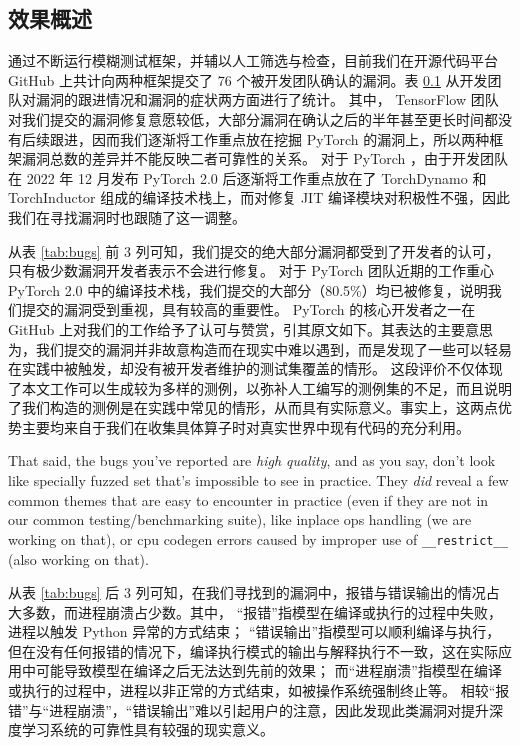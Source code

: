 \subsection{效果概述}

通过不断运行模糊测试框架，并辅以人工筛选与检查，目前我们在开源代码平台 GitHub 上共计向两种框架提交了 76 个被开发团队确认的漏洞。表 \ref{} 从开发团队对漏洞的跟进情况和漏洞的症状两方面进行了统计。
其中， TensorFlow 团队对我们提交的漏洞修复意愿较低，大部分漏洞在确认之后的半年甚至更长时间都没有后续跟进，因而我们逐渐将工作重点放在挖掘 PyTorch 的漏洞上，所以两种框架漏洞总数的差异并不能反映二者可靠性的关系。
对于 PyTorch ，由于开发团队在 2022 年 12 月发布 PyTorch 2.0 后逐渐将工作重点放在了 TorchDynamo 和 TorchInductor 组成的编译技术栈上，而对修复 JIT 编译模块对积极性不强，因此我们在寻找漏洞时也跟随了这一调整。

从表 \ref{tab:bugs} 前 3 列可知，我们提交的绝大部分漏洞都受到了开发者的认可，只有极少数漏洞开发者表示不会进行修复。
对于 PyTorch 团队近期的工作重心 PyTorch 2.0 中的编译技术栈，我们提交的大部分（80.5\%）均已被修复，说明我们提交的漏洞受到重视，具有较高的重要性。
PyTorch 的核心开发者之一在 GitHub 上对我们的工作给予了认可与赞赏，引其原文\cite{ngimel_comments}如下。其表达的主要意思为，我们提交的漏洞并非故意构造而在现实中难以遇到，而是发现了一些可以轻易在实践中被触发，却没有被开发者维护的测试集覆盖的情形。
这段评价不仅体现了本文工作可以生成较为多样的测例，以弥补人工编写的测例集的不足，而且说明了我们构造的测例是在实践中常见的情形，从而具有实际意义。事实上，这两点优势主要均来自于我们在收集具体算子时对真实世界中现有代码的充分利用。

\begin{shadequote}
\small
That said, the bugs you've reported are \textit{high quality}, and as you say, don't look like specially fuzzed set that's impossible to see in practice. They \textit{did} reveal a few common themes that are easy to encounter in practice (even if they are not in our common testing/benchmarking suite), like inplace ops handling (we are working on that), or cpu codegen errors caused by improper use of \texttt{\_\_restrict\_\_} (also working on that).
\end{shadequote}

从表 \ref{tab:bugs} 后 3 列可知，在我们寻找到的漏洞中，报错与错误输出的情况占大多数，而进程崩溃占少数。其中，
“报错”指模型在编译或执行的过程中失败，进程以触发 Python 异常的方式结束；
“错误输出”指模型可以顺利编译与执行，但在没有任何报错的情况下，编译执行模式的输出与解释执行不一致，这在实际应用中可能导致模型在编译之后无法达到先前的效果；
而“进程崩溃”指模型在编译或执行的过程中，进程以非正常的方式结束，如被操作系统强制终止等。
相较“报错”与“进程崩溃”，“错误输出”难以引起用户的注意，因此发现此类漏洞对提升深度学习系统的可靠性具有较强的现实意义。


